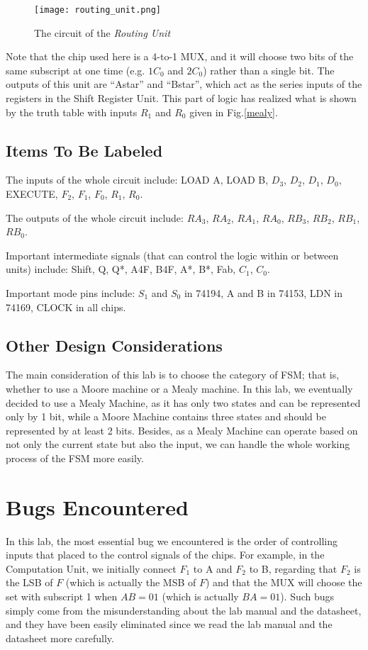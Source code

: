 \documentclass[12pt]{article}
\begin{document}
\begin{figure}[h]
    \centering
    \texttt{[image: routing\_unit.png]}
    \caption{The circuit of the \textit{Routing Unit}}
    \label{routing}
\end{figure}

Note that the chip used here is a 4-to-1 MUX, and it will choose two bits of the same subscript at one time (e.g. $1C_0$ and $2C_0$) rather than a single bit. The outputs of this unit are “Astar” and “Bstar”, which act as the series inputs of the registers in the Shift Register Unit. This part of logic has realized what is shown by the truth table with inputs $R_1$ and $R_0$ given in Fig.\ref{mealy}.

\subsection{Items To Be Labeled}
The inputs of the whole circuit include: LOAD A, LOAD B, $D_3$, $D_2$, $D_1$, $D_0$, EXECUTE, $F_2$, $F_1$, $F_0$, $R_1$, $R_0$.

The outputs of the whole circuit include: $RA_3$, $RA_2$, $RA_1$, $RA_0$, $RB_3$, $RB_2$, $RB_1$, $RB_0$.

Important intermediate signals (that can control the logic within or between units) include: Shift, Q, Q*, A4F, B4F, A*, B*, Fab, $C_1$, $C_0$.

Important mode pins include: $S_1$ and $S_0$ in 74194, A and B in 74153, LDN in 74169, CLOCK in all chips.

\subsection{Other Design Considerations}
\label{tradeoff}
The main consideration of this lab is to choose the category of FSM; that is, whether to use a Moore machine or a Mealy machine. In this lab, we eventually decided to use a Mealy Machine, as it has only two states and can be represented only by 1 bit, while a Moore Machine contains three states and should be represented by at least 2 bits. Besides, as a Mealy Machine can operate based on not only the current state but also the input, we can handle the whole working process of the FSM more easily. 

\section{Bugs Encountered}
\label{bugs}
In this lab, the most essential bug we encountered is the order of controlling inputs that placed to the control signals of the chips. For example, in the Computation Unit, we initially connect $F_1$ to A and $F_2$ to B, regarding that $F_2$ is the LSB of $F$ (which is actually the MSB of $F$) and that the MUX will choose the set with subscript 1 when $AB=01$ (which is actually $BA=01$). Such bugs simply come from the misunderstanding about the lab manual and the datasheet, and they have been easily eliminated since we read the lab manual and the datasheet more carefully. 
\end{document}
